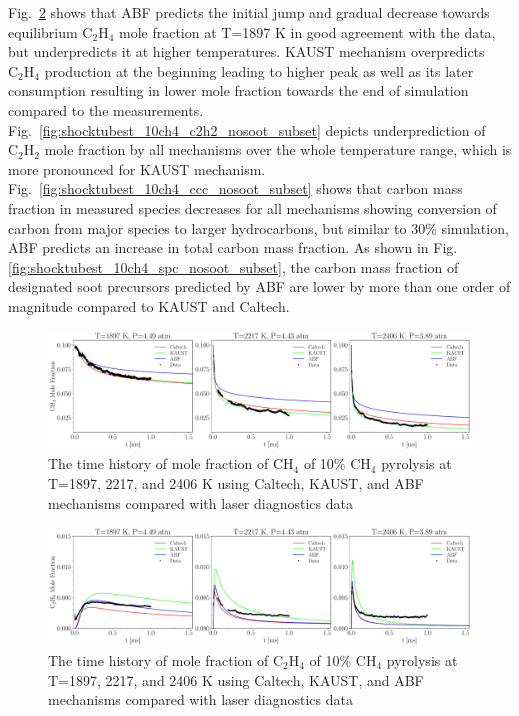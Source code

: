 Fig.~\ref{fig:shocktubest_10ch4_c2h4_nosoot_subset} shows that ABF predicts the initial jump and gradual decrease towards equilibrium $\mathrm{C_2H_4}$ mole fraction at T=1897 K in good agreement with the data, but underpredicts it at higher temperatures. KAUST mechanism overpredicts $\mathrm{C_2H_4}$ production at the beginning leading to higher peak as well as its later consumption resulting in lower mole fraction towards the end of simulation compared to the measurements. Fig.~\ref{fig:shocktubest_10ch4_c2h2_nosoot_subset} depicts underprediction of $\mathrm{C_2H_2}$ mole fraction by all mechanisms over the whole temperature range, which is more pronounced for KAUST mechanism. Fig.~\ref{fig:shocktubest_10ch4_ccc_nosoot_subset} shows that carbon mass fraction in measured species decreases for all mechanisms showing conversion of carbon from major species to larger hydrocarbons, but similar to 30\% simulation, ABF predicts an increase in total carbon mass fraction. As shown in Fig.\ref{fig:shocktubest_10ch4_spc_nosoot_subset}, the carbon mass fraction of designated soot precursors predicted by ABF are lower by more than one order of magnitude compared to KAUST and Caltech.

\begin{figure}[H]
	\centering
	\includegraphics[width=1\textwidth]{Figures/Results/Shocktube/Stanford/September/10CH4_CH4_mechs_nosoot_subset.pdf}
	\caption{The time history of mole fraction of $\mathrm{CH_4}$ of 10\% $\mathrm{CH_4}$ pyrolysis at T=1897, 2217, and 2406 K using Caltech, KAUST, and ABF mechanisms compared with laser diagnostics data}
	\label{fig:shocktubest_10ch4_ch4_nosoot_subset} 
\end{figure}


 \begin{figure}[H]
	\centering
	\includegraphics[width=1\textwidth]{Figures/Results/Shocktube/Stanford/September/10CH4_C2H4_mechs_nosoot_subset.pdf}
	\caption{The time history of mole fraction of $\mathrm{C_2H_4}$ of 10\% $\mathrm{CH_4}$ pyrolysis at T=1897, 2217, and 2406 K using Caltech, KAUST, and ABF mechanisms compared with laser diagnostics data}
	\label{fig:shocktubest_10ch4_c2h4_nosoot_subset} 
\end{figure}

